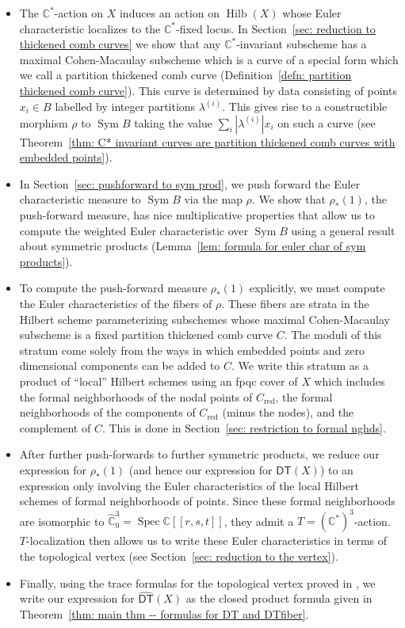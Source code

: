 \documentclass[12pt]{amsart}
\theoremstyle{definition}
\newcommand{\CC} {\mathbb{C}}          %
\newcommand{\Sym}{\operatorname{Sym}}
\newcommand{\Hilb}{\operatorname{Hilb}}
\newcommand{\DT}{\mathsf{DT}}
\newcommand{\Spec}{\operatorname{Spec}}
\renewcommand{\hat}{\widehat}
\newcommand{\DThat}{\widehat{\DT}}
\newcommand{\red}{\mathrm{red}}
\begin{document}
\begin{itemize}
\item The $\CC^{*}$-action on $X$ induces an action on $\Hilb (X)$
whose Euler characteristic localizes to the $\CC^{*}$-fixed locus.  In
Section~\ref{sec: reduction to thickened comb curves} we show that any
$\CC^{*}$-invariant subscheme has a maximal Cohen-Macaulay subscheme
which is a curve of a special form which we call a partition thickened
comb curve (Definition~\ref{defn: partition thickened comb
curve}). This curve is determined by data consisting of points
$x_{i}\in B$ labelled by integer partitions $\lambda^{(i)}$. This
gives rise to a constructible morphism $\rho$ to $\Sym B$ taking the
value $\sum_{i} |\lambda^{(i)}|x_{i}$ on such a curve (see
Theorem~\ref{thm: C* invariant curves are partition thickened comb
curves with embedded points}).


\item In Section~\ref{sec: pushforward to sym prod}, we push forward
the Euler characteristic measure to $\Sym B$ via the map $\rho$. We
show that $\rho_{*}(1)$, the push-forward measure, has nice
multiplicative properties that allow us to compute the weighted
Euler characteristic over $\Sym B$ using a general result about
symmetric products (Lemma~\ref{lem: formula for euler char of sym
products}). 
\item To compute the push-forward measure $\rho_{*}(1)$ explicitly, we
must compute the Euler characteristics of the fibers of $\rho$. These
fibers are strata in the Hilbert scheme parameterizing subschemes
whose maximal Cohen-Macaulay subscheme is a fixed partition thickened
comb curve $C$. The moduli of this stratum come solely from the ways
in which embedded points and zero dimensional components can be added to
$C$. We write this stratum as a product of ``local'' Hilbert schemes
using an fpqc cover of $X$ which includes the formal neighborhoods of
the nodal points of $C_{\red}$, the formal neighborhoods of the
components of $C_{\red}$ (minus the nodes), and the complement of
$C$. This is done in Section~\ref{sec: restriction
to formal nghds}. 
\item After further push-forwards to further symmetric products, we
reduce our expression for $\rho_{*}(1)$ (and hence our expression for
$\DThat (X)$) to an expression only involving the Euler
characteristics of the local Hilbert schemes of formal neighborhoods
of points. Since these formal neighborhoods are isomorphic to
$\hat{\CC}^{3}_{0}=\Spec \CC [[r,s,t]]$, they admit a $T=\left(\CC^{*}
\right)^{3}$-action. $T$-localization then allows us to write these
Euler characteristics in terms of the topological vertex (see
Section~\ref{sec: reduction to the vertex}). 
\item Finally, using the trace formulas for the topological vertex
proved in \cite{Bryan-Kool-Young}, we write our expression for
$\DThat (X)$ as the closed product formula given in Theorem~\ref{thm:
main thm -- formulas for DT and DTfiber}. 
\end{itemize}
\end{document}
